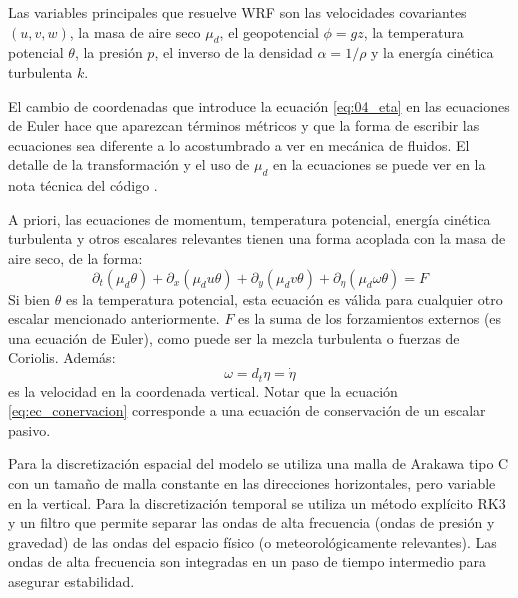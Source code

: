 Las variables principales que resuelve WRF son las velocidades covariantes $(u,v,w)$, la masa de aire seco $\mu_d$, el geopotencial $\phi = gz$, la temperatura potencial $\theta$, la presión $p$, el inverso de la densidad $\alpha= 1/\rho$ y la energía cinética turbulenta $k$. 

El cambio de coordenadas que introduce la ecuación \ref{eq:04_eta} en las ecuaciones de Euler hace que aparezcan términos métricos y que la forma de escribir las ecuaciones sea diferente a lo acostumbrado a ver en mecánica de fluidos. El detalle de la transformación y el uso de $\mu_d$ en la ecuaciones se puede ver en la nota técnica del código \citep{https://doi.org/10.5065/d68s4mvh}.

A priori, las ecuaciones de momentum, temperatura potencial, energía cinética turbulenta y otros escalares relevantes tienen una forma acoplada con la masa de aire seco, de la forma:
\begin{equation}\label{eq:ec_conervacion}
\partial_t (\mu_d\theta) + \partial_x(\mu_d u \theta)+\partial_y(\mu_d v \theta)+\partial_\eta (\mu_d \omega \theta) = F
\end{equation}
Si bien $\theta$ es la temperatura potencial, esta ecuación es válida para cualquier otro escalar mencionado anteriormente.
$F$ es la suma de los forzamientos externos (es una ecuación de Euler), como puede ser la mezcla turbulenta o fuerzas de Coriolis. Además:
\begin{equation}
\omega = d_t\eta = \dot{\eta}
\end{equation}
es la velocidad en la coordenada vertical. Notar que la ecuación \ref{eq:ec_conervacion} corresponde a una ecuación de conservación de un escalar pasivo.

Para la discretización espacial del modelo se utiliza una malla de Arakawa tipo C con un tamaño de malla constante en las direcciones horizontales, pero variable en la vertical. Para la discretización temporal se utiliza un método explícito RK3 y un filtro que permite separar las ondas de alta frecuencia (ondas de presión y gravedad) de las ondas del espacio físico (o meteorológicamente relevantes). Las ondas de alta frecuencia son integradas en un paso de tiempo intermedio para asegurar estabilidad.

